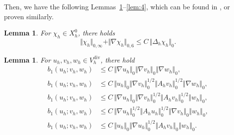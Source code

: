 \documentclass[a4paper,fleqn]{cas-sc}
\numberwithin{equation}{section}
\newtheorem{lemma}[theorem]{Lemma}
\theoremstyle{definition}
\begin{document}
Then, we have the following Lemmas~\ref{lem:1}--\ref{lem:4}, which can be
found in \cite{Liu42017,Diegel2017,Heywood1982,Heywood1990}, or proven
similarly.

\begin{lemma}
  \label{lem:1}
  For $\chi_{h}\in X^{0}_{h}$, there holds
  \begin{equation}
    \Vert\chi_{h}\Vert_{0,\infty}
    + \Vert\nabla\chi_{h}\Vert_{0,6}
    \le C\,\Vert\Delta_{h}\chi_{h}\Vert_{0}.
    \label{eq:2.26}
  \end{equation}
\end{lemma}

\begin{lemma}
  \label{lem:2}
  For $u_{h},v_{h},w_{h}\in V_{h}^{\mathrm{div}}$, there hold
  \begin{align}
    b_{1}(u_{h};v_{h},w_{h})
    &\le C\,\Vert\nabla u_{h}\Vert_{0}
            \Vert\nabla v_{h}\Vert_{0}
            \Vert\nabla w_{h}\Vert_{0},
    \label{eq:2.27}\\
    b_{1}(u_{h};v_{h},w_{h})
    &\le C\,\Vert u_{h}\Vert_{0}
            \Vert\nabla v_{h}\Vert_{0}^{1/2}
            \Vert A_{h}v_{h}\Vert_{0}^{1/2}
            \Vert\nabla w_{h}\Vert_{0},
    \label{eq:2.28}\\
    b_{1}(u_{h};v_{h},w_{h})
    &\le C\,\Vert\nabla u_{h}\Vert_{0}
            \Vert\nabla v_{h}\Vert_{0}^{1/2}
            \Vert A_{h}v_{h}\Vert_{0}^{1/2}
            \Vert w_{h}\Vert_{0},
    \label{eq:2.29}\\
    b_{1}(u_{h};v_{h},w_{h})
    &\le C\,\Vert\nabla u_{h}\Vert_{0}^{1/2}
            \Vert A_{h}u_{h}\Vert_{0}^{1/2}
            \Vert\nabla v_{h}\Vert_{0}
            \Vert w_{h}\Vert_{0},
    \label{eq:2.30}\\
    b_{1}(u_{h};v_{h},w_{h})
    &\le C\,\Vert u_{h}\Vert_{0}
            \Vert\nabla u_{h}\Vert_{0}^{1/2}
            \Vert A_{h}v_{h}\Vert_{0}
            \Vert w_{h}\Vert_{0}.
    \label{eq:2.31}
  \end{align}
\end{lemma}
\end{document}
